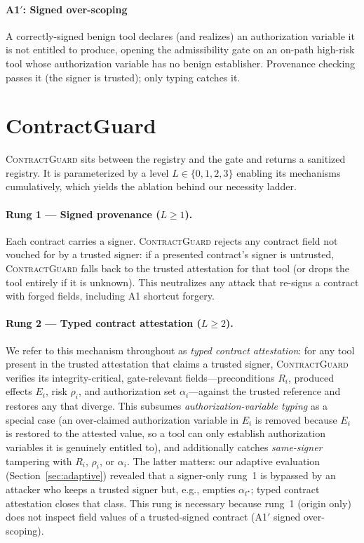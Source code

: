 \documentclass[conference,onecolumn]{IEEEtran}
\theoremstyle{definition}
\newcommand{\cg}{\textsc{ContractGuard}}
\begin{document}
\paragraph{A1$'$: Signed over-scoping}
A correctly-signed benign tool declares (and realizes) an authorization variable
it is not entitled to produce, opening the admissibility gate on an on-path
high-risk tool whose authorization variable has no benign establisher.
Provenance checking passes it (the signer is trusted); only typing catches it.

\section{ContractGuard}
\label{sec:cg}
\cg{} sits between the registry and the gate and returns a sanitized registry.
It is parameterized by a level $L\in\{0,1,2,3\}$ enabling its mechanisms
cumulatively, which yields the ablation behind our necessity ladder.

\paragraph{Rung 1 --- Signed provenance ($L\geq 1$).}
Each contract carries a signer. \cg{} rejects any contract field not vouched for
by a trusted signer: if a presented contract's signer is untrusted, \cg{} falls
back to the trusted attestation for that tool (or drops the tool entirely if it
is unknown). This neutralizes any attack that re-signs a contract with forged
fields, including A1 shortcut forgery.

\paragraph{Rung 2 --- Typed contract attestation ($L\geq 2$).}
We refer to this mechanism throughout as \emph{typed contract attestation}: for
any tool present in the trusted attestation that claims a trusted signer,
\cg{} verifies its integrity-critical, gate-relevant fields---preconditions
$R_i$, produced effects $E_i$, risk $\rho_i$, and authorization set
$\alpha_i$---against the trusted reference and restores any that diverge. This
subsumes \emph{authorization-variable typing} as a special case (an over-claimed
authorization variable in $E_i$ is removed because $E_i$ is restored to the
attested value, so a tool can only establish authorization variables it is
genuinely entitled to), and additionally catches \emph{same-signer} tampering
with $R_i$, $\rho_i$, or $\alpha_i$. The latter matters: our adaptive evaluation
(Section~\ref{sec:adaptive}) revealed that a signer-only rung~1 is bypassed by an
attacker who keeps a trusted signer but, e.g., empties $\alpha_{t^\star}$;
typed contract attestation closes that class. This rung is necessary because
rung~1 (origin only) does not inspect field values of a trusted-signed contract
(A1$'$ signed over-scoping).
\end{document}
